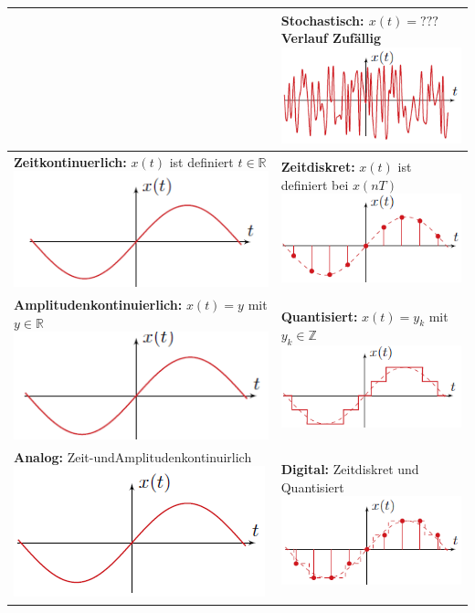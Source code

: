 \begin{tabular}{C{4.5cm}|C{4.5cm}}
	& \textbf{Stochastisch:} $x(t) = ???$ Verlauf Zufällig
	\includegraphics[width=0.4\columnwidth]{Images/stochastisch} \\ \midrule
	\textbf{Zeitkontinuerlich:} $x(t)$ ist definiert $t \in \mathbb{R}$
	\includegraphics[width=0.4\columnwidth]{Images/Zeitkontinuerlich}
	& \textbf{Zeitdiskret:} $x(t)$ ist definiert bei $x(nT)$
	\includegraphics[width=0.4\columnwidth]{Images/zeitdiskret} \\ \midrule
	\textbf{Amplitudenkontinuierlich:} $x(t) = y$ mit $y \in  \mathbb{R}$	
	\includegraphics[width=0.4\columnwidth]{Images/Amplitudenkontinuierlich}
	& \textbf{Quantisiert:} $x(t) = y_k$ mit $y_k \in \mathbb{Z}$
	\includegraphics[width=0.4\columnwidth]{Images/quantisiert}\\ \midrule
	\textbf{Analog:} Zeit-undAmplitudenkontinuirlich
	\includegraphics[width=0.4\columnwidth]{Images/analog}
	& \textbf{Digital:} Zeitdiskret und Quantisiert
	\includegraphics[width=0.4\columnwidth]{Images/digital}	
\end{tabular}

